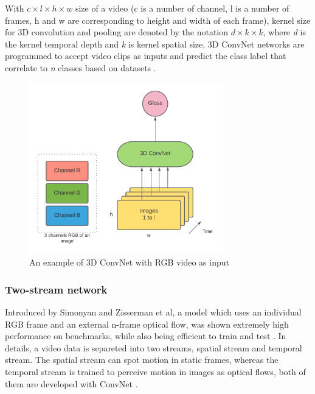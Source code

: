 \documentclass[a4paper, 12pt]{article}
\begin{document}
With \textit{\begin{math} c \times l \times h \times w \end{math}} size of a video (c is a number of channel, l is a number of frames, h and w are corresponding to height and width of each frame),
kernel size for 3D convolution and pooling are denoted by the notation \textit{\begin{math}d \times k \times k\end{math}}, where \textit{d} is the kernel temporal depth and \textit{k} is kernel spatial size, 3D ConvNet networks are programmed to accept video clips as inputs and predict the class label that correlate to \textit{n} classes based on datasets \citep{tran2015learning}.

\begin{figure}[H]
    \centering
    \includegraphics[width=0.75\textwidth]{3D ConvNet Model.png}
    \caption{An example of 3D ConvNet with RGB video as input}
    \label{Figure 3D ConvNet}
\end{figure}

\subsubsection{Two-stream network}
Introduced by Simonyan and Zisserman et al, a model which uses an individual RGB frame and an external n-frame optical flow, was shown extremely high performance on benchmarks, while also being efficient to train and test \citep{simonyan2014two}. In details, a video data is separeted into two streams, spatial stream and temporal stream. The spatial stream can spot motion in static frames, whereas the temporal stream is trained to perceive motion in images as optical flows, both of them are developed with ConvNet \citep{simonyan2014two}.
\end{document}

